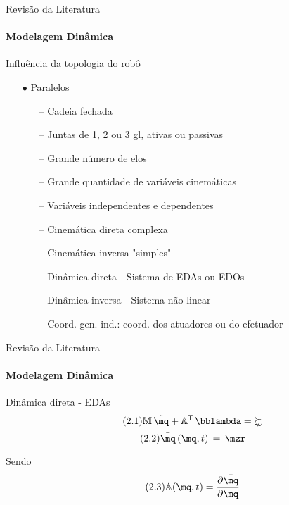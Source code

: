 \documentclass[25pt,landscape]{beamer}
\begin{document}
\begin{frame}{Revisão da Literatura}
    \framesubtitle{Modelagem Dinâmica}
    \begin{block}{Influência da topologia do robô}
    	\begin{itemize}
    		\item[$\bullet$] Paralelos
    		\begin{itemize}
    			\pause
    			\item[--] Cadeia fechada \\[4pt]
    			\item[--] Juntas de 1, 2 ou 3 gl, ativas ou passivas \\[4pt]
    			\item[--] Grande número de elos \\[4pt]
    			\item[--] Grande quantidade de variáveis cinemáticas \\[4pt]
    			\item[--] Variáveis independentes e dependentes \\[4pt]
    			\item[--] Cinemática direta complexa \\[4pt]
    			\item[--] Cinemática inversa "simples" \\[4pt]
    			\item[--] Dinâmica direta - Sistema de EDAs ou EDOs \\[4pt]
    			\item[--] Dinâmica inversa - Sistema não linear \\[4pt]
    			\item[--] Coord. gen. ind.: coord. dos atuadores ou do efetuador \\[4pt]
    		\end{itemize}
    	\end{itemize}
    \end{block}
\end{frame}

\begin{frame}{Revisão da Literatura}
    \framesubtitle{Modelagem Dinâmica}
    \begin{block}{Dinâmica direta - EDAs}
		\begin{equation} \label{DAE1} \tag{2.1}
			\mM \, \ddot{\mq} + \mA^\msT \,\mlambda = \meta
		\end{equation}
		\begin{equation} \label{DAE2} \tag{2.2}
			\bar{\mq} \, (\mq,t) \, = \, \mzr
		\end{equation}
	
		Sendo
		\begin{equation} \tag{2.3}
			\mA(\mq,t) = \frac{\partial \bar{\mq}}{\partial \mq}
		\end{equation}
	\end{block}
\end{frame}
\end{document}
